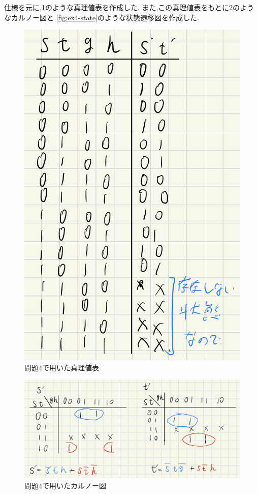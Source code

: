 \documentclass[autodetect-engine, dvi=dvipdfmx, 10pt, a4paper, ja=standard]{bxjsarticle}
\begin{document}
仕様を元に,\ref{fig:ex4-tf}のような真理値表を作成した.
また,この真理値表をもとに\ref{fig:ex4-karnaugh}のようなカルノー図と
\ref{fig:ex4-state}のような状態遷移図を作成した.


\begin{figure}[H]
	\centering
	\includegraphics[width=0.8\columnwidth]{asset/ex4_tf.png}
	\caption{問題4で用いた真理値表}
	\label{fig:ex4-tf}
\end{figure}


\begin{figure}[H]
	\centering
	\includegraphics[width=0.8\columnwidth]{asset/ex4_ka.png}
	\caption{問題4で用いたカルノー図}
	\label{fig:ex4-karnaugh}
\end{figure}
\end{document}
